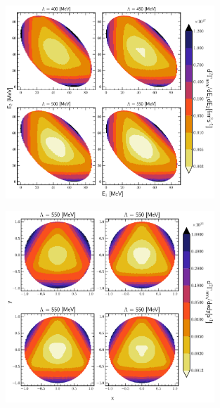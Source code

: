     \begin{figure}[h]
        \begin{center}
        \includegraphics[width=0.7\textwidth]{PlotData/PION/Dalitz_maps/figures/Dalitz_map_nnn_E1E2_cutofs.pdf}
        \end{center}
        \caption{}
        \label{pion_nnn_E1E2_cutoff}
    \end{figure}

    \begin{figure}[h]
        \begin{center}
        \includegraphics[width=0.7\textwidth]{PlotData/PION/Dalitz_maps/figures/Dalitz_map_nnn_xy_orders.pdf}
        \end{center}
        \caption{}
        \label{pion_nnn_xy_order}
    \end{figure}

